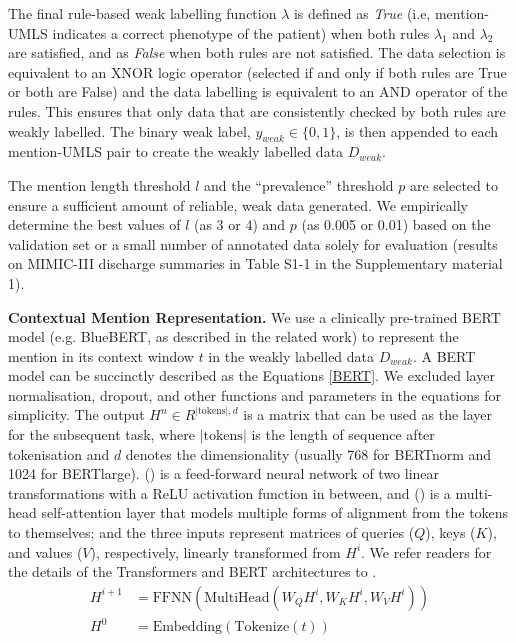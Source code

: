 \documentclass[twocolumn]{bmcart}
\begin{document}
The final rule-based weak labelling function $\lambda$ is defined as \emph{True} (i.e, mention-UMLS indicates a correct phenotype of the patient) when both rules $\lambda_1$ and $\lambda_2$ are satisfied, and as \emph{False} when both rules are not satisfied. The data selection is equivalent to an XNOR logic operator (selected if and only if both rules are True or both are False) and the data labelling is equivalent to an AND operator of the rules. This ensures that only data that are consistently checked by both rules are weakly labelled. The binary weak label, $y_{weak} \in \{0,1\}$, is then appended to each mention-UMLS pair to create the weakly labelled data $D_{weak}$.

The mention length threshold $l$ and the ``prevalence'' threshold $p$ are selected to ensure a sufficient amount of reliable, weak data generated. We empirically determine the best values of $l$ (as 3 or 4) and $p$ (as 0.005 or 0.01) based on the validation set or a small number of annotated data solely for evaluation (results on MIMIC-III discharge summaries in Table S1-1 in the Supplementary material 1).

\textbf{Contextual Mention Representation.} We use a clinically pre-trained BERT model (e.g. BlueBERT, as described in the related work) to represent the mention in its context window $t$ in the weakly labelled data $D_{weak}$. A BERT model can be succinctly described as the Equations \ref{BERT}. We excluded layer normalisation, dropout, and other functions and parameters in the equations for simplicity. The output $H^n \in R^{|\text{tokens}|,d}$ is a matrix that can be used as the layer for the subsequent task, where $|\text{tokens}|$ is the length of sequence after tokenisation and $d$ denotes the dimensionality (usually 768 for BERTnorm and 1024 for BERTlarge). () is a feed-forward neural network of two linear transformations with a ReLU activation function in between, and () is a multi-head self-attention layer that models multiple forms of alignment from the tokens to themselves; and the three inputs represent matrices of queries ($Q$), keys ($K$), and values ($V$), respectively, linearly transformed from $H^i$. We refer readers for the details of the Transformers and BERT architectures to \cite{vaswani2017attention,devlin-etal-2019-bert}.
\begin{equation}\label{BERT}
\begin{split}
  H^{i+1} & = \text{FFNN}(\text{MultiHead}(W_QH^i,W_KH^i,W_VH^i)) \\
  H^0 & = \text{Embedding}(\text{Tokenize}(t))
\end{split}
\end{equation}
\end{document}

